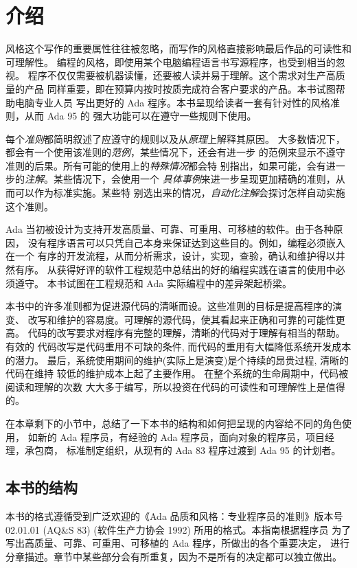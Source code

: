 \chapter{介绍}
\label{c:intro}
\pagestyle{fancy}

风格这个写作的重要属性往往被忽略，而写作的风格直接影响最后作品的可读性和
可理解性。 编程的风格，即使用某个电脑编程语言书写源程序，也受到相当的忽视。
程序不仅仅需要被机器读懂，还要被人读并易于理解。这个需求对生产高质量的产品
同样重要，即在预算内按时按质完成符合客户要求的产品。本书试图帮助电脑专业人员
写出更好的 Ada 程序。本书呈现给读者一套有针对性的风格准则，从而 Ada 95 的
强大功能可以在遵守一些规则下使用。

每个\emph{准则}都简明叙述了应遵守的规则以及从\emph{原理}上解释其原因。
大多数情况下，都会有一个使用该准则的\emph{范例}，某些情况下，还会有进一步
的范例来显示不遵守准则的后果。所有可能的使用上的\emph{特殊情况}都会特
别指出，如果可能，会有进一步的\emph{注解}。某些情况下，会使用一个
\emph{具体事例}来进一步呈现更加精确的准则，从而可以作为标准实施。某些特
别选出来的情况，\emph{自动化注解}会探讨怎样自动实施这个准则。

Ada 当初被设计为支持开发高质量、可靠、可重用、可移植的软件。由于各种原因，
没有程序语言可以只凭自己本身来保证达到这些目的。例如，编程必须嵌入在一个
有序的开发流程，从而分析需求，设计，实现，查验，确认和维护得以井然有序。
从获得好评的软件工程规范中总结出的好的编程实践在语言的使用中必须遵守。
本书试图在工程规范和 Ada 实际编程中的差异架起桥梁。

本书中的许多准则都为促进源代码的清晰而设。这些准则的目标是提高程序的演变、
改写和维护的容易度。可理解的源代码，使其看起来正确和可靠的可能性更高。
代码的改写要求对程序有完整的理解，清晰的代码对于理解有相当的帮助。有效的
代码改写是代码重用不可缺的条件, 而代码的重用有大幅降低系统开发成本的潜力。
最后，系统使用期间的维护(实际上是演变)是个持续的昂贵过程, 清晰的代码在维持
较低的维护成本上起了主要作用。 在整个系统的生命周期中，代码被阅读和理解的次数
大大多于编写，所以投资在代码的可读性和可理解性上是值得的。

在本章剩下的小节中，总结了一下本书的结构和如何把呈现的内容给不同的角色使用，
如新的 Ada 程序员，有经验的 Ada 程序员，面向对象的程序员，项目经理，承包商，
标准制定组织，从现有的 Ada 83 程序过渡到 Ada 95 的计划者。
 
\section{本书的结构}
本书的格式遵循受到广泛欢迎的《Ada 品质和风格：专业程序员的准则》版本号
 02.01.01 (AQ\&S 83) (软件生产力协会 1992) 所用的格式。本指南根据程序员
为了写出高质量、可靠、可重用、可移植的 Ada 程序，所做出的各个重要决定，
进行分章描述。章节中某些部分会有所重复，因为不是所有的决定都可以独立做出。

